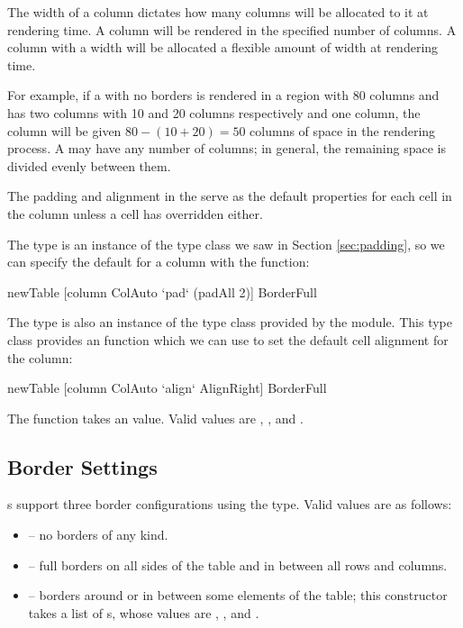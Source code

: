 The width of a column dictates how many columns will be allocated to
it at rendering time.  A  column will be rendered in the
specified number of columns.  A column with a  width will
be allocated a flexible amount of width at rendering time.

For example, if a  with no borders is rendered in a region
with 80 columns and has two  columns with 10 and 20
columns respectively and one  column, the 
column will be given $80 - (10 + 20) = 50$ columns of space in the
rendering process.  A  may have any number of 
columns; in general, the remaining space is divided evenly between
them.

The padding and alignment in the  serve as the default
properties for each cell in the column unless a cell has overridden
either.

The  type is an instance of the  type
class we saw in Section \ref{sec:padding}, so we can specify the
default  for a column with the  function:

\begin{haskellcode}
 newTable [column ColAuto `pad` (padAll 2)] BorderFull
\end{haskellcode}

The  type is also an instance of the 
type class provided by the  module.  This type class
provides an  function which we can use to set the default
cell alignment for the column:

\begin{haskellcode}
 newTable [column ColAuto `align` AlignRight] BorderFull
\end{haskellcode}

The  function takes an  value.  Valid values
are , , and .

\subsection{Border Settings}

s support three border configurations using the
 type.  Valid values are as follows:

\begin{itemize}
\item {} -- no borders of any kind.
\item {} -- full borders on all sides of the table and in
  between all rows and columns.
\item {} -- borders around or in between some elements
  of the table; this constructor takes a list of s,
  whose values are , , and .
\end{itemize}

